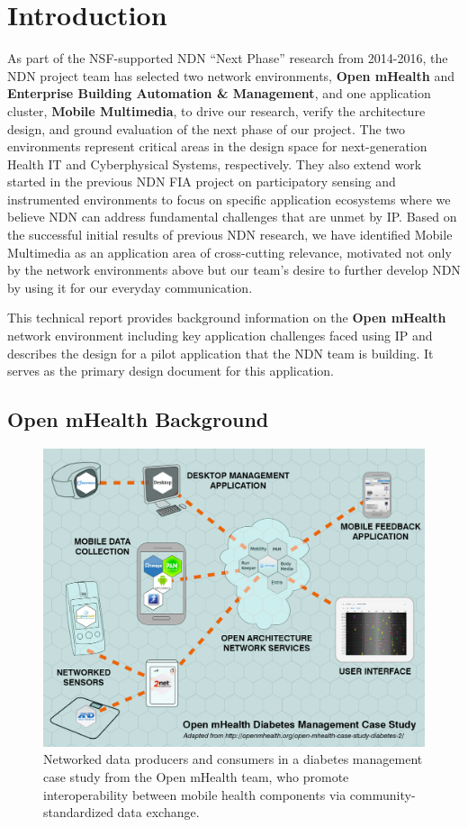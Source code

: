 \section{Introduction}

As part of the NSF-supported NDN ``Next Phase'' research from 2014-2016, 
the NDN project team has selected two network environments, {\bf Open mHealth} and {\bf
Enterprise Building Automation \& Management}, and one application
cluster, {\bf Mobile Multimedia}, to drive our research, verify the
architecture design, and ground evaluation of the next phase of our project.
The two environments represent critical areas in the design space for
next-generation Health IT and Cyberphysical Systems, respectively.  They
also extend work started in the previous NDN FIA project on participatory
sensing and instrumented environments to focus on specific application
ecosystems where we believe NDN can address fundamental challenges that
are unmet by IP.  Based on the successful initial results of previous
NDN research, we have identified Mobile  Multimedia as an application
area of cross-cutting relevance, motivated not only by the
network environments above but our team's desire to further develop
NDN by using it for our everyday communication.

This technical report provides background information on the {\bf Open mHealth}
network environment including key application challenges faced using
IP and describes the design for a pilot application that the NDN team is 
building.  It serves as the primary design document for this application. 

\subsection{Open mHealth Background}

\begin{figure}
\includegraphics[width=.5\textwidth]{figures/OpenmHealth-figure}
\vskip -5pt
\caption{Networked data producers and consumers in a diabetes management case study from the Open mHealth team, who promote interoperability between mobile health components via community-standardized data exchange.~\cite{SimEstrin2010}}
\vskip 6pt
\label{fig:mHealth}
\end{figure}


